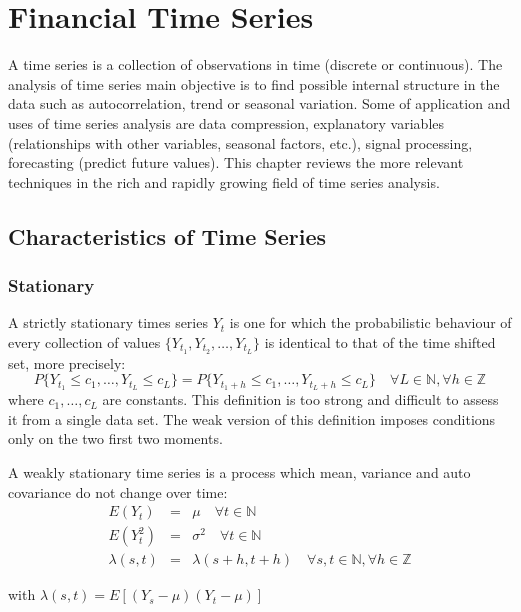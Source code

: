 
\chapter{Financial Time Series}

\vspace{0.5cm} 
 
A time series is a collection of observations in time (discrete or continuous).
The analysis of time series main objective is to find possible internal
structure in the data such as autocorrelation, trend or seasonal variation.
Some of application and uses of time series analysis are data compression,
explanatory variables (relationships with other variables, seasonal factors,
etc.), signal processing, forecasting (predict future values). This chapter
reviews the more relevant techniques in the rich and rapidly growing field of
time series analysis.


\section{Characteristics of Time Series}

\subsection{Stationary }
A strictly stationary times series $Y_t$ is one for which the probabilistic behaviour
of every collection of values $\{Y_{t_1},Y_{t_2},\dots,Y_{t_L}\}$ is identical
to that of the time shifted set, more precisely: \[ P\{Y_{t_1} \leq
c_1,\dots,Y_{t_L} \leq c_L\} = P\{Y_{t_1+h} \leq c_1,\dots,Y_{t_L+h} \leq c_L\}
\quad \forall L \in \mathbb{N}, \forall h \in \mathbb{Z}\] \noindent where
$c_1,\dots,c_L$ are constants.  This definition is too strong and difficult to
assess it from a single data set. The weak version of this definition imposes
conditions only on the two first two moments.

A weakly stationary time series is a process which mean, variance and auto
covariance do not change over time: \begin{eqnarray*} E(Y_t) &=& \mu  \quad
\forall t \in \mathbb{N} \\ E(Y^2_t) &=& \sigma^2  \quad \forall t \in
\mathbb{N} \\ \lambda(s,t)&=&\lambda(s+h,t+h) \quad \forall s,t \in \mathbb{N},
\forall h \in \mathbb{Z} \end{eqnarray*}

\noindent with $\lambda(s,t) = E[(Y_s-\mu)(Y_t - \mu)]$ 


